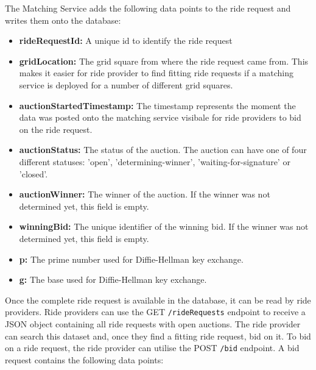 The Matching Service adds the following data points to the ride request and writes them onto the database:

\begin{itemize}
    \item \textbf{rideRequestId:} A unique id to identify the ride request
    \item \textbf{gridLocation:} The grid square from where the ride request came from. This makes it easier for ride provider to find fitting ride requests if a matching service is deployed for a number of different grid squares. 
    \item \textbf{auctionStartedTimestamp:} The timestamp represents the moment the data was posted onto the matching service visibale for ride providers to bid on the ride request. 
    \item \textbf{auctionStatus:} The status of the auction. The auction can have one of four different statuses: 'open', 'determining-winner', 'waiting-for-signature' or 'closed'. 
    \item \textbf{auctionWinner:} The winner of the auction. If the winner was not determined yet, this field is empty.
    \item \textbf{winningBid:} The unique identifier of the winning bid. If the winner was not determined yet, this field is empty.
    \item \textbf{p:} The prime number used for Diffie-Hellman key exchange.
    \item \textbf{g:} The base used for Diffie-Hellman key exchange.
\end{itemize}

Once the complete ride request is available in the database, it can be read by ride providers. Ride providers can use the GET \texttt{/rideRequests} endpoint to receive a JSON object containing all ride requests with open auctions. The ride provider can search this dataset and, once they find a fitting ride request, bid on it.
To bid on a ride request, the ride provider can utilise the POST \texttt{/bid} endpoint. A bid request contains the following data points:

